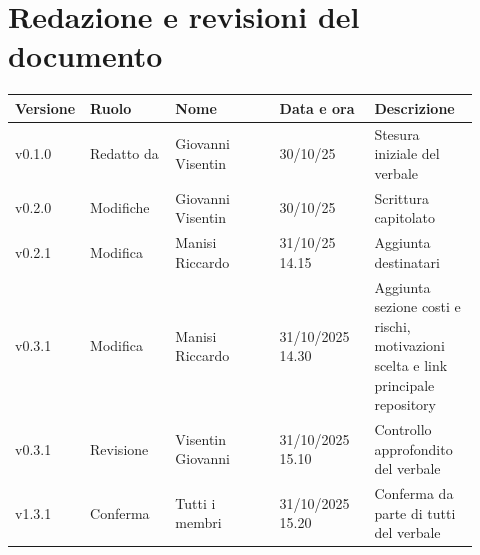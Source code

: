 \documentclass[a4paper,12pt]{article}
\begin{document}
\clearpage
\section{Redazione e revisioni del documento}

\begin{center}
\small
\renewcommand{\arraystretch}{1.2} 
\begin{tabular}{|p{0.1\linewidth}|p{0.18\linewidth}|p{0.22\linewidth}|p{0.20\linewidth}|p{0.22\linewidth}|}
\hline
\rowcolor{gray!60} 
\textbf{Versione} & \textbf{Ruolo} & \textbf{Nome} & \textbf{Data e ora} & \textbf{Descrizione} \\
\hline
\rowcolor{white}
v0.1.0 & Redatto da & Giovanni Visentin & 30/10/25 & Stesura iniziale del verbale \\
\hline
\rowcolor{gray!20}
v0.2.0 & Modifiche & Giovanni Visentin & 30/10/25 &  Scrittura capitolato\\
\hline
\rowcolor{white}
v0.2.1 & Modifica & Manisi Riccardo & 31/10/25 14.15 & Aggiunta destinatari \\
\hline
\rowcolor{gray!20}
v0.3.1 & Modifica & Manisi Riccardo & 31/10/2025 14.30 & Aggiunta sezione costi e rischi, motivazioni scelta e link principale repository \\
\hline
\rowcolor{white}
v0.3.1 & Revisione & Visentin Giovanni & 31/10/2025 15.10 & Controllo approfondito del verbale \\
\hline
\rowcolor{gray!20}
v1.3.1 & Conferma & Tutti i membri & 31/10/2025 15.20 & Conferma da parte di tutti del verbale \\
\hline

\end{tabular}
\end{center}
\end{document}
